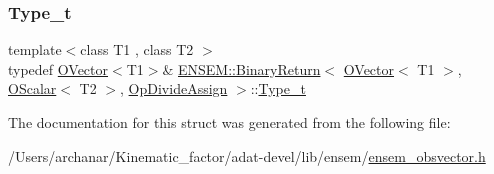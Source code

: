 \mbox{\label{structENSEM_1_1BinaryReturn_3_01OVector_3_01T1_01_4_00_01OScalar_3_01T2_01_4_00_01OpDivideAssign_01_4_ab2bcb8c826e18a2c69b8d9122e888059}} 
\subsubsection{\texorpdfstring{Type\_t}{Type\_t}\hspace{0.1cm}{\footnotesize\ttfamily [3/3]}}
{\footnotesize\ttfamily template$<$class T1 , class T2 $>$ \\
typedef \mbox{\hyperlink{classENSEM_1_1OVector}{O\+Vector}}$<$T1$>$\& \mbox{\hyperlink{structENSEM_1_1BinaryReturn}{E\+N\+S\+E\+M\+::\+Binary\+Return}}$<$ \mbox{\hyperlink{classENSEM_1_1OVector}{O\+Vector}}$<$ T1 $>$, \mbox{\hyperlink{classENSEM_1_1OScalar}{O\+Scalar}}$<$ T2 $>$, \mbox{\hyperlink{structENSEM_1_1OpDivideAssign}{Op\+Divide\+Assign}} $>$\+::\mbox{\hyperlink{structENSEM_1_1BinaryReturn_3_01OVector_3_01T1_01_4_00_01OScalar_3_01T2_01_4_00_01OpDivideAssign_01_4_ab2bcb8c826e18a2c69b8d9122e888059}{Type\+\_\+t}}}



The documentation for this struct was generated from the following file\+:\begin{DoxyCompactItemize}
\item 
/\+Users/archanar/\+Kinematic\+\_\+factor/adat-\/devel/lib/ensem/\mbox{\hyperlink{adat-devel_2lib_2ensem_2ensem__obsvector_8h}{ensem\+\_\+obsvector.\+h}}\end{DoxyCompactItemize}
